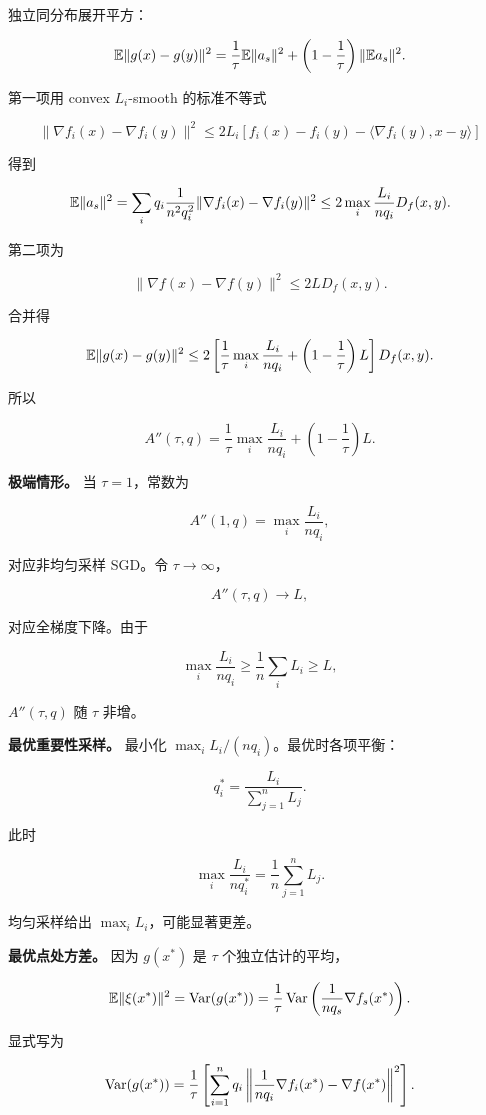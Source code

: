 独立同分布展开平方：

\[
  \mathbb{E}\|g(x)-g(y)\|^2
  =
  \frac1\tau\mathbb{E}\|a_s\|^2
  +
  \left(1-\frac1\tau\right)\|\mathbb{E} a_s\|^2.
\]

第一项用 convex \(L_i\)-smooth 的标准不等式

\[
  \|\nabla f_i(x)-\nabla f_i(y)\|^2
  \le
  2L_i
  \left[
    f_i(x)-f_i(y)-\langle\nabla f_i(y),x-y\rangle
  \right]
\]

得到

\[
  \mathbb{E}\|a_s\|^2
  =
  \sum_i q_i
  \frac{1}{n^2q_i^2}
  \|\nabla f_i(x)-\nabla f_i(y)\|^2
  \le
  2\max_i\frac{L_i}{nq_i}D_f(x,y).
\]

第二项为

\[
  \|\nabla f(x)-\nabla f(y)\|^2
  \le 2L D_f(x,y).
\]

合并得

\[
  \mathbb{E}\|g(x)-g(y)\|^2
  \le
  2
  \left[
    \frac1\tau \max_i\frac{L_i}{nq_i}
    +
    \left(1-\frac1\tau\right)L
  \right]
  D_f(x,y).
\]

所以

\[
  A''(\tau,q)=
  \frac1\tau \max_i\frac{L_i}{nq_i}
  +
  \left(1-\frac1\tau\right)L.
\]

\textbf{极端情形。} 当 \(\tau=1\)，常数为

\[
  A''(1,q)=\max_i\frac{L_i}{nq_i},
\]

对应非均匀采样 SGD。令 \(\tau\to\infty\)，

\[
  A''(\tau,q)\to L,
\]

对应全梯度下降。由于

\[
  \max_i\frac{L_i}{nq_i}\ge \frac1n\sum_i L_i\ge L,
\]

\(A''(\tau,q)\) 随 \(\tau\) 非增。

\textbf{最优重要性采样。} 最小化 \(\max_i L_i/(nq_i)\)。最优时各项平衡：

\[
  q_i^*=\frac{L_i}{\sum_{j=1}^{n}L_j}.
\]

此时

\[
  \max_i\frac{L_i}{nq_i^*}
  =
  \frac1n\sum_{j=1}^{n}L_j.
\]

均匀采样给出 \(\max_i L_i\)，可能显著更差。

\textbf{最优点处方差。} 因为 \(g(x^*)\) 是 \(\tau\) 个独立估计的平均，

\[
  \mathbb{E}\|\xi(x^*)\|^2
  =
  \operatorname{Var}(g(x^*))
  =
  \frac1\tau
  \operatorname{Var}\left(
    \frac{1}{nq_s}\nabla f_s(x^*)
  \right).
\]

显式写为

\[
  \operatorname{Var}(g(x^*))
  =
  \frac1\tau
  \left[
    \sum_{i=1}^{n}
    q_i
    \left\|
      \frac{1}{nq_i}\nabla f_i(x^*)-\nabla f(x^*)
    \right\|^2
  \right].
\]

